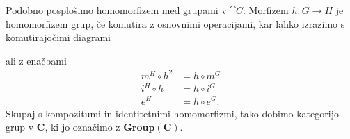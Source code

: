 \documentclass[../kategoricna_logika.tex]{subfiles}
\begin{document}
Podobno posplošimo homomorfizem med grupami v $\cat{C}$: Morfizem
$h : G \to H$ je homomorfizem grup, če komutira z osnovnimi operacijami,
kar lahko izrazimo s komutirajočimi diagrami
%
\begin{center}
\end{center}
ali z enačbami
\begin{align*}
m^H \circ h^2 &= h \circ m^G \\
i^H \circ h &= h \circ i^G \\
e^H &= h \circ e^G.
\end{align*}
Skupaj s kompozitumi in identitetnimi homomorfizmi, tako dobimo
kategorijo grup v $\mathbf{C}$, ki jo označimo z $\mathbf{Group}(\mathbf{C})$.
\end{document}

